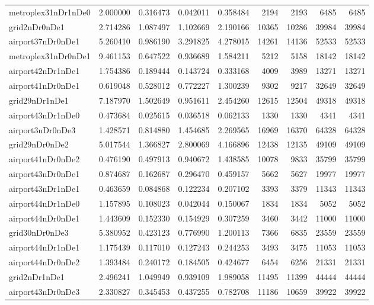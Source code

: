 \begin{longtable}{|l|r|r|r|r|r|r|r|r|}
metroplex31nDr1nDe0 & 2.000000 & 0.316473 & 0.042011 & 0.358484 & 2194 & 2193 & 6485 & 6485 \\
grid2nDr0nDe1 & 2.714286 & 1.087497 & 1.102669 & 2.190166 & 10365 & 10286 & 39984 & 39984 \\
airport37nDr0nDe1 & 5.260410 & 0.986190 & 3.291825 & 4.278015 & 14261 & 14136 & 52533 & 52533 \\
metroplex31nDr0nDe1 & 9.461153 & 0.647522 & 0.936689 & 1.584211 & 5212 & 5158 & 18142 & 18142 \\
airport42nDr1nDe1 & 1.754386 & 0.189444 & 0.143724 & 0.333168 & 4009 & 3989 & 13271 & 13271 \\
airport41nDr0nDe1 & 0.619048 & 0.528012 & 0.772227 & 1.300239 & 9302 & 9217 & 32649 & 32649 \\
grid29nDr1nDe1 & 7.187970 & 1.502649 & 0.951611 & 2.454260 & 12615 & 12504 & 49318 & 49318 \\
airport43nDr1nDe0 & 0.473684 & 0.025615 & 0.036518 & 0.062133 & 1330 & 1330 & 4341 & 4341 \\
airport3nDr0nDe3 & 1.428571 & 0.814880 & 1.454685 & 2.269565 & 16969 & 16370 & 64328 & 64328 \\
grid29nDr0nDe2 & 5.017544 & 1.366827 & 2.800069 & 4.166896 & 12438 & 12135 & 49109 & 49109 \\
airport41nDr0nDe2 & 0.476190 & 0.497913 & 0.940672 & 1.438585 & 10078 & 9833 & 35799 & 35799 \\
airport43nDr0nDe1 & 0.874687 & 0.162687 & 0.296470 & 0.459157 & 5662 & 5627 & 19977 & 19977 \\
airport43nDr1nDe1 & 0.463659 & 0.084868 & 0.122234 & 0.207102 & 3393 & 3379 & 11343 & 11343 \\
airport44nDr1nDe0 & 1.157895 & 0.108023 & 0.042044 & 0.150067 & 1834 & 1834 & 5052 & 5052 \\
airport44nDr0nDe1 & 1.443609 & 0.152330 & 0.154929 & 0.307259 & 3460 & 3442 & 11000 & 11000 \\
grid30nDr0nDe3 & 5.380952 & 0.423123 & 0.776990 & 1.200113 & 7366 & 6835 & 23559 & 23559 \\
airport44nDr1nDe1 & 1.175439 & 0.117010 & 0.127243 & 0.244253 & 3493 & 3475 & 11053 & 11053 \\
airport44nDr0nDe2 & 1.393484 & 0.240172 & 0.184505 & 0.424677 & 6454 & 6256 & 21331 & 21331 \\
grid2nDr1nDe1 & 2.496241 & 1.049949 & 0.939109 & 1.989058 & 11495 & 11399 & 44444 & 44444 \\
airport43nDr0nDe3 & 2.330827 & 0.345453 & 0.437255 & 0.782708 & 11186 & 10659 & 39922 & 39922 \\

\end{longtable}

